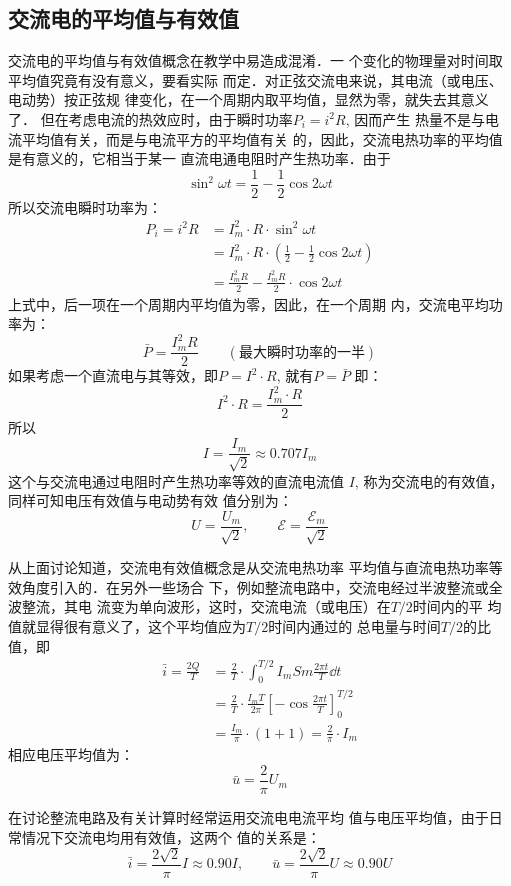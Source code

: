 \subsection{交流电的平均值与有效值}
交流电的平均值与有效值概念在教学中易造成混淆．一
个变化的物理量对时间取平均值究竟有没有意义，要看实际
而定．对正弦交流电来说，其电流（或电压、电动势）按正弦规
律变化，在一个周期内取平均值，显然为零，就失去其意义了．
但在考虑电流的热效应时，由于瞬时功率$P_i=i^2R$, 因而产生
热量不是与电流平均值有关，而是与电流平方的平均值有关
的，因此，交流电热功率的平均值是有意义的，它相当于某一
直流电通电阻时产生热功率．由于
\[\sin^2\omega t=\frac{1}{2}-\frac{1}{2}\cos2\omega t\]
所以交流电瞬时功率为：
\[\begin{split}
    P_i=i^2R &=I^2_m\cdot  R\cdot \sin^2 \omega t\\
    &=I^2_m\cdot  R\cdot \left(\frac{1}{2}-\frac{1}{2}\cos2\omega t\right)\\
    &=\frac{I_m^2 R}{2}-\frac{I_m^2 R}{2}\cdot \cos2\omega t
\end{split}\]
上式中，后一项在一个周期内平均值为零，因此，在一个周期
内，交流电平均功率为：
\[\bar P=\frac{I_m^2 R}{2}\qquad (\text{最大瞬时功率的一半})\]
如果考虑一个直流电与其等效，即$P=I^2\cdot R$, 就有$P=\bar P$
即：
\[I^2\cdot R=\frac{I^2_m\cdot R}{2}\]
所以
\[I=\frac{I_m}{\sqrt{2}}\approx 0.707I_m\]
这个与交流电通过电阻时产生热功率等效的直流电流值
$I$, 称为交流电的有效值，同样可知电压有效值与电动势有效
值分别为：
\[U=\frac{U_m}{\sqrt{2}},\qquad \mathcal{E}=\frac{\mathcal{E}_m}{\sqrt{2}}\]

从上面讨论知道，交流电有效值概念是从交流电热功率
平均值与直流电热功率等效角度引入的．在另外一些场合
下，例如整流电路中，交流电经过半波整流或全波整流，其电
流变为单向波形，这时，交流电流（或电压）在$T/2$时间内的平
均值就显得很有意义了，这个平均值应为$T/2$时间内通过的
总电量与时间$T/2$的比值，即
\[\begin{split}
\bar i=\frac{2Q}{T}&=\frac{2}{T}\cdot \int^{T/2}_0 I_m Sm\frac{2\pi t}{T}\dd t\\
&=\frac{2}{T}\cdot \frac{I_m T}{2\pi} \left[-\cos\frac{2\pi t}{T}\right]^{T/2}_0\\
&=\frac{I_m}{\pi}\cdot (1+1)=\frac{2}{\pi}\cdot I_m
\end{split}
    \]
相应电压平均值为：
\[\bar u=\frac{2}{\pi}U_m\]

在讨论整流电路及有关计算时经常运用交流电电流平均
值与电压平均值，由于日常情况下交流电均用有效值，这两个
值的关系是：
\[\bar i=\frac{2\sqrt{2}}{\pi}I\approx 0.90I,\qquad \bar u=\frac{2\sqrt{2}}{\pi}U\approx 0.90U\]


